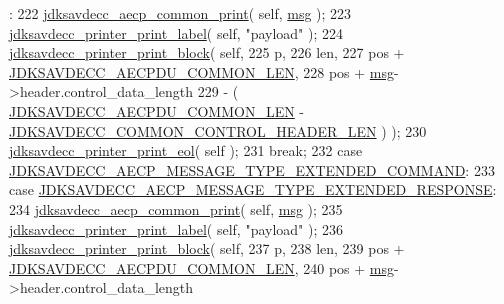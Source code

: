 \begin{DoxyCode}
      :
222         \hyperlink{group__aecp__print_gabf23e817595afca199205bb410a5eca6}{jdksavdecc\_aecp\_common\_print}( \textcolor{keyword}{self}, \hyperlink{maap__log__linux_8c_a0c7e58a50354c4a4d6dad428d0e47029}{msg} );
223         \hyperlink{group__util_gaf7818b24143b3c7502926a425a242ff5}{jdksavdecc\_printer\_print\_label}( \textcolor{keyword}{self}, \textcolor{stringliteral}{"payload"} );
224         \hyperlink{group__util_ga18d7b11e396f21996dedde77febcb22f}{jdksavdecc\_printer\_print\_block}( \textcolor{keyword}{self},
225                                         p,
226                                         len,
227                                         pos + \hyperlink{group__aecpdu_ga1311febb873dfac7b4035ed25460f9d1}{JDKSAVDECC\_AECPDU\_COMMON\_LEN},
228                                         pos + \hyperlink{maap__log__linux_8c_a0c7e58a50354c4a4d6dad428d0e47029}{msg}->header.control\_data\_length
229                                         - ( \hyperlink{group__aecpdu_ga1311febb873dfac7b4035ed25460f9d1}{JDKSAVDECC\_AECPDU\_COMMON\_LEN} - 
      \hyperlink{group__jdksavdecc__avtp__common__control__header_gaae84052886fb1bb42f3bc5f85b741dff}{JDKSAVDECC\_COMMON\_CONTROL\_HEADER\_LEN} ) );
230         \hyperlink{group__util_gacda56c9d3d24593a52c999682fa6e6e3}{jdksavdecc\_printer\_print\_eol}( \textcolor{keyword}{self} );
231         \textcolor{keywordflow}{break};
232     \textcolor{keywordflow}{case} \hyperlink{group__aecp__message__type_ga3e49dd85a1e6d1ef5f18fad578c048f4}{JDKSAVDECC\_AECP\_MESSAGE\_TYPE\_EXTENDED\_COMMAND}:
233     \textcolor{keywordflow}{case} \hyperlink{group__aecp__message__type_ga81cc685902a06aa709023d5e9283d097}{JDKSAVDECC\_AECP\_MESSAGE\_TYPE\_EXTENDED\_RESPONSE}:
234         \hyperlink{group__aecp__print_gabf23e817595afca199205bb410a5eca6}{jdksavdecc\_aecp\_common\_print}( \textcolor{keyword}{self}, \hyperlink{maap__log__linux_8c_a0c7e58a50354c4a4d6dad428d0e47029}{msg} );
235         \hyperlink{group__util_gaf7818b24143b3c7502926a425a242ff5}{jdksavdecc\_printer\_print\_label}( \textcolor{keyword}{self}, \textcolor{stringliteral}{"payload"} );
236         \hyperlink{group__util_ga18d7b11e396f21996dedde77febcb22f}{jdksavdecc\_printer\_print\_block}( \textcolor{keyword}{self},
237                                         p,
238                                         len,
239                                         pos + \hyperlink{group__aecpdu_ga1311febb873dfac7b4035ed25460f9d1}{JDKSAVDECC\_AECPDU\_COMMON\_LEN},
240                                         pos + \hyperlink{maap__log__linux_8c_a0c7e58a50354c4a4d6dad428d0e47029}{msg}->header.control\_data\_length

\end{DoxyCode}
